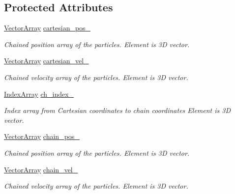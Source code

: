 \subsection*{Protected Attributes}
\begin{DoxyCompactItemize}
\item 
\mbox{\hyperlink{class_space_h_1_1_vel_indep_particles_aa9983058940249df8b00fa800e8cbad2}{Vector\+Array}} \mbox{\hyperlink{class_space_h_1_1_vel_indep_chain_particles_ae1479bfdab0d0676ee500f878698a75a}{cartesian\+\_\+pos\+\_\+}}
\begin{DoxyCompactList}\small\item\em Chained position array of the particles. Element is 3D vector. \end{DoxyCompactList}\item 
\mbox{\hyperlink{class_space_h_1_1_vel_indep_particles_aa9983058940249df8b00fa800e8cbad2}{Vector\+Array}} \mbox{\hyperlink{class_space_h_1_1_vel_indep_chain_particles_a8634735aa331abbdd5befc3d208b11eb}{cartesian\+\_\+vel\+\_\+}}
\begin{DoxyCompactList}\small\item\em Chained velocity array of the particles. Element is 3D vector. \end{DoxyCompactList}\item 
\mbox{\hyperlink{class_space_h_1_1_vel_indep_chain_particles_a48b9183f8d68fe8af42bf405125d450c}{Index\+Array}} \mbox{\hyperlink{class_space_h_1_1_vel_indep_chain_particles_a4801898e53bf6ece4ed588e03646b8a8}{ch\+\_\+index\+\_\+}}
\begin{DoxyCompactList}\small\item\em Index array from Cartesian coordinates to chain coordinates Element is 3D vector. \end{DoxyCompactList}\item 
\mbox{\hyperlink{class_space_h_1_1_vel_indep_particles_aa9983058940249df8b00fa800e8cbad2}{Vector\+Array}} \mbox{\hyperlink{class_space_h_1_1_vel_indep_chain_particles_a6426404ff1098f28e34b9867c3b64e0c}{chain\+\_\+pos\+\_\+}}
\begin{DoxyCompactList}\small\item\em Chained position array of the particles. Element is 3D vector. \end{DoxyCompactList}\item 
\mbox{\hyperlink{class_space_h_1_1_vel_indep_particles_aa9983058940249df8b00fa800e8cbad2}{Vector\+Array}} \mbox{\hyperlink{class_space_h_1_1_vel_indep_chain_particles_a79106719ec89861a02086b0a52eced21}{chain\+\_\+vel\+\_\+}}
\begin{DoxyCompactList}\small\item\em Chained velocity array of the particles. Element is 3D vector. \end{DoxyCompactList}\end{DoxyCompactItemize}
